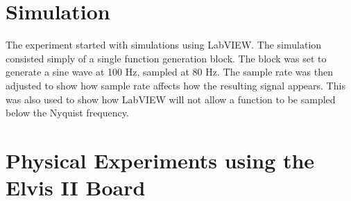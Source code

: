 
	\section{Simulation}
	The experiment started with simulations using LabVIEW. The simulation consisted simply of a single function generation block. The block was set to generate a sine wave at 100 Hz, sampled at 80 Hz. The sample rate was then adjusted to show how sample rate affects how the resulting signal appears. This was also used to show how LabVIEW will not allow a function to be sampled below the Nyquist frequency.
	
	\section{Physical Experiments using the Elvis II Board}
